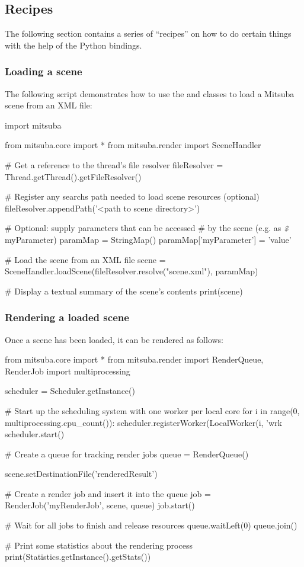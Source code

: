 \subsection{Recipes}
The following section contains a series of ``recipes'' on how to do
certain things with the help of the Python bindings.

\subsubsection{Loading a scene}
The following script demonstrates how to use the
 and  classes to
load a Mitsuba scene from an XML file:
\begin{python}
import mitsuba

from mitsuba.core import *
from mitsuba.render import SceneHandler

# Get a reference to the thread's file resolver
fileResolver = Thread.getThread().getFileResolver()

# Register any searchs path needed to load scene resources (optional)
fileResolver.appendPath('<path to scene directory>')

# Optional: supply parameters that can be accessed
# by the scene (e.g. as $\text{\color{lstcomment}\itshape\texttt{\$}}$myParameter)
paramMap = StringMap()
paramMap['myParameter'] = 'value'

# Load the scene from an XML file
scene = SceneHandler.loadScene(fileResolver.resolve("scene.xml"), paramMap)

# Display a textual summary of the scene's contents
print(scene)
\end{python}

\subsubsection{Rendering a loaded scene}
Once a scene has been loaded, it can be rendered as follows:
\begin{python}
from mitsuba.core import *
from mitsuba.render import RenderQueue, RenderJob
import multiprocessing

scheduler = Scheduler.getInstance()

# Start up the scheduling system with one worker per local core
for i in range(0, multiprocessing.cpu_count()):
	scheduler.registerWorker(LocalWorker(i, 'wrk%
scheduler.start()

# Create a queue for tracking render jobs
queue = RenderQueue()

scene.setDestinationFile('renderedResult')

# Create a render job and insert it into the queue
job = RenderJob('myRenderJob', scene, queue)
job.start()

# Wait for all jobs to finish and release resources
queue.waitLeft(0)
queue.join()

# Print some statistics about the rendering process
print(Statistics.getInstance().getStats())
\end{python}

